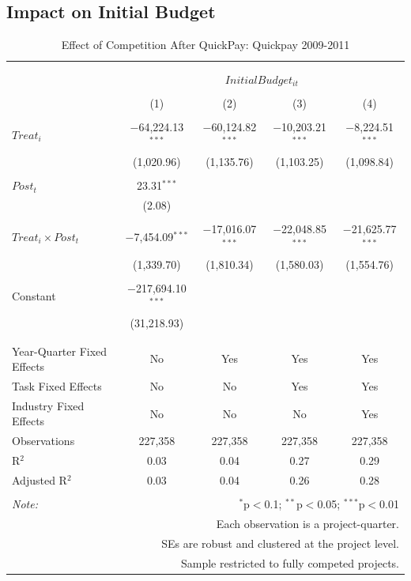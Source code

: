 \documentclass[
]{article}
\begin{document}
\hypertarget{impact-on-initial-budget}{%
\subsection{Impact on Initial Budget}\label{impact-on-initial-budget}}

\begin{table}[H] \centering 
  \caption{Effect of Competition After QuickPay: Quickpay 2009-2011} 
  \label{} 
\small 
\begin{tabular}{@{\extracolsep{-2pt}}lcccc} 
\\[-1.8ex]\hline 
\hline \\[-1.8ex] 
\\[-1.8ex] & \multicolumn{4}{c}{$InitialBudget_{it}$} \\ 
\\[-1.8ex] & (1) & (2) & (3) & (4)\\ 
\hline \\[-1.8ex] 
 $Treat_i$ & $-$64,224.13$^{***}$ & $-$60,124.82$^{***}$ & $-$10,203.21$^{***}$ & $-$8,224.51$^{***}$ \\ 
  & (1,020.96) & (1,135.76) & (1,103.25) & (1,098.84) \\ 
  & & & & \\ 
 $Post_t$ & 23.31$^{***}$ &  &  &  \\ 
  & (2.08) &  &  &  \\ 
  & & & & \\ 
 $Treat_i \times Post_t$ & $-$7,454.09$^{***}$ & $-$17,016.07$^{***}$ & $-$22,048.85$^{***}$ & $-$21,625.77$^{***}$ \\ 
  & (1,339.70) & (1,810.34) & (1,580.03) & (1,554.76) \\ 
  & & & & \\ 
 Constant & $-$217,694.10$^{***}$ &  &  &  \\ 
  & (31,218.93) &  &  &  \\ 
  & & & & \\ 
\hline \\[-1.8ex] 
Year-Quarter Fixed Effects & No & Yes & Yes & Yes \\ 
Task Fixed Effects & No & No & Yes & Yes \\ 
Industry Fixed Effects & No & No & No & Yes \\ 
Observations & 227,358 & 227,358 & 227,358 & 227,358 \\ 
R$^{2}$ & 0.03 & 0.04 & 0.27 & 0.29 \\ 
Adjusted R$^{2}$ & 0.03 & 0.04 & 0.26 & 0.28 \\ 
\hline 
\hline \\[-1.8ex] 
\textit{Note:}  & \multicolumn{4}{r}{$^{*}$p$<$0.1; $^{**}$p$<$0.05; $^{***}$p$<$0.01} \\ 
 & \multicolumn{4}{r}{Each observation is a project-quarter.} \\ 
 & \multicolumn{4}{r}{SEs are robust and clustered at the project level.} \\ 
 & \multicolumn{4}{r}{Sample restricted to fully competed projects.} \\ 
\end{tabular} 
\end{table}
\end{document}
